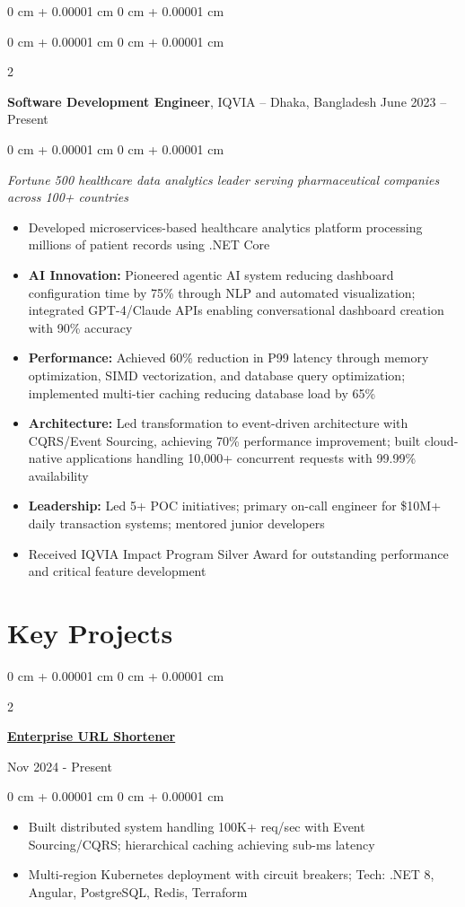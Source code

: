 \documentclass[10pt, letterpaper]{article}
\newenvironment{highlights}{
    \begin{itemize}[
        topsep=0.05 cm,
        parsep=0.05 cm,
        partopsep=0pt,
        itemsep=0pt,
        leftmargin=0 cm + 10pt
    ]
}{
    \end{itemize}
} %
\newenvironment{onecolentry}{
    \begin{adjustwidth}{
        0 cm + 0.00001 cm
    }{
        0 cm + 0.00001 cm
    }
}{
    \end{adjustwidth}
} %
\newenvironment{twocolentry}[2][]{
    \onecolentry
    \def\secondColumn{#2}
    \setcolumnwidth{\fill, 4.5 cm}
    \begin{paracol}{2}
}{
    \switchcolumn \raggedleft \secondColumn
    \end{paracol}
    \endonecolentry
} %
\begin{document}
\begin{onecolentry}
        \begin{twocolentry}{
            June 2023 – Present
        }
            \textbf{Software Development Engineer}, IQVIA -- Dhaka, Bangladesh\end{twocolentry}
        \begin{onecolentry}
            \textit{Fortune 500 healthcare data analytics leader serving pharmaceutical companies across 100+ countries}
            \begin{highlights}
                \item Developed microservices-based healthcare analytics platform processing millions of patient records using .NET Core
                \item \textbf{AI Innovation:} Pioneered agentic AI system reducing dashboard configuration time by 75\% through NLP and automated visualization; integrated GPT-4/Claude APIs enabling conversational dashboard creation with 90\% accuracy
                \item \textbf{Performance:} Achieved 60\% reduction in P99 latency through memory optimization, SIMD vectorization, and database query optimization; implemented multi-tier caching reducing database load by 65\%
                \item \textbf{Architecture:} Led transformation to event-driven architecture with CQRS/Event Sourcing, achieving 70\% performance improvement; built cloud-native applications handling 10,000+ concurrent requests with 99.99\% availability
                \item \textbf{Leadership:} Led 5+ POC initiatives; primary on-call engineer for \$10M+ daily transaction systems; mentored junior developers
                \item Received IQVIA Impact Program Silver Award for outstanding performance and critical feature development
            \end{highlights}
        \end{onecolentry}

    \section{Key Projects}

        \begin{twocolentry}{
            Nov 2024 - Present
        }
            \href{https://github.com/thromel/URLShortener}{\textbf{Enterprise URL Shortener}}
        \end{twocolentry}
        \begin{onecolentry}
            \begin{highlights}
                \item Built distributed system handling 100K+ req/sec with Event Sourcing/CQRS; hierarchical caching achieving sub-ms latency
                \item Multi-region Kubernetes deployment with circuit breakers; Tech: .NET 8, Angular, PostgreSQL, Redis, Terraform
            \end{highlights}
        \end{onecolentry}


\end{onecolentry}
\end{document}
